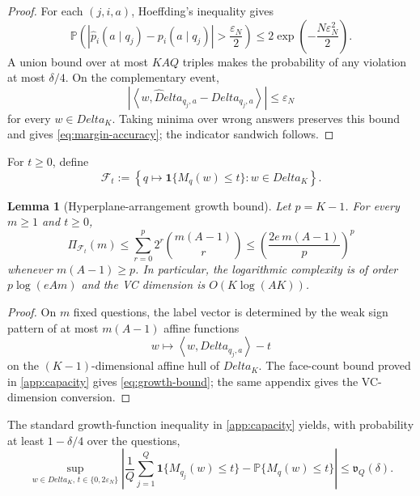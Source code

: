 \documentclass[11pt]{article}
\def\Delta{Delta}%
\newtheorem{lemma}[theorem]{Lemma}
\newcommand{\Pp}{\mathbb P}
\newcommand{\one}{\mathbf 1}
\newcommand{\calF}{\mathcal F}
\newcommand{\eps}{\varepsilon}
\newcommand{\abs}[1]{\left|#1\right|}
\newcommand{\inner}[2]{\left\langle#1,#2\right\rangle}
\begin{document}
\begin{proof}
For each $(j,i,a)$, Hoeffding's inequality gives
\[
\Pp\left(
\abs{\widehat p_i(a\mid q_j)-p_i(a\mid q_j)}>\frac{\eps_N}{2}
\right)
\le
2\exp\left(-\frac{N\eps_N^2}{2}\right).
\]
A union bound over at most $KAQ$ triples makes the probability of any violation at most $\delta/4$.  On the complementary event,
\[
\abs{\inner{w}{\widehat\Delta_{q_j,a}-\Delta_{q_j,a}}}
\le\eps_N
\]
for every $w\in\Delta_K$.  Taking minima over wrong answers preserves this bound and gives \eqref{eq:margin-accuracy}; the indicator sandwich follows.
\end{proof}

For $t\ge0$, define
\begin{equation}
\label{eq:margin-class}
\calF_t
:=
\left\{
q\mapsto\one\{M_q(w)\le t\}:w\in\Delta_K
\right\}.
\end{equation}

\begin{lemma}[Hyperplane-arrangement growth bound]
\label{lem:capacity}
Let $p=K-1$.  For every $m\ge1$ and $t\ge0$,
\begin{equation}
\label{eq:growth-bound}
\Pi_{\calF_t}(m)
\le
\sum_{r=0}^{p}2^r\binom{m(A-1)}{r}
\le
\left(\frac{2e\,m(A-1)}{p}\right)^p
\end{equation}
whenever $m(A-1)\ge p$.  In particular, the logarithmic complexity is of order $p\log(eAm)$ and the VC dimension is $O(K\log(AK))$.
\end{lemma}

\begin{proof}
On $m$ fixed questions, the label vector is determined by the weak sign pattern of at most $m(A-1)$ affine functions
\[
w\mapsto\inner{w}{\Delta_{q_j,a}}-t
\]
on the $(K-1)$-dimensional affine hull of $\Delta_K$.  The face-count bound proved in \cref{app:capacity} gives \eqref{eq:growth-bound}; the same appendix gives the VC-dimension conversion.
\end{proof}

The standard growth-function inequality in \cref{app:capacity} yields, with probability at least $1-\delta/4$ over the questions,
\begin{equation}
\label{eq:uniform-margin-deviation}
\sup_{w\in\Delta_K,\,t\in\{0,2\eps_N\}}
\left|
\frac1Q\sum_{j=1}^Q\one\{M_{q_j}(w)\le t\}
-
\Pp\{M_q(w)\le t\}
\right|
\le\mathfrak v_Q(\delta).
\end{equation}
\end{document}
